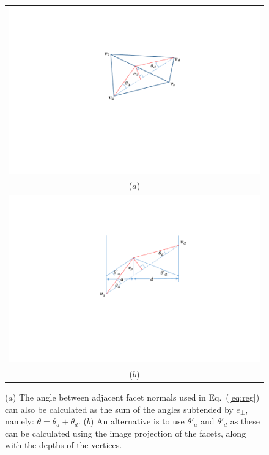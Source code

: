 \begin{figure}
\begin{center}
\begin{tabular}{c}
   \includegraphics[trim=140 110 130 70,clip,width=0.6\linewidth]{Figures/adjacentFacets} \\
   ($a$) \\
   \includegraphics[trim=140 110 140 60,clip,width=0.7\linewidth]{Figures/adjacentApprox} \\
   ($b$) \\
\end{tabular}
\end{center}
   \caption{($a$) The angle between adjacent facet normals used in Eq.~(\ref{eq:reg}) can also be calculated as the sum of the angles subtended by $e_\perp$, namely: $\theta = \theta_a+\theta_d$. ($b$) An alternative is to use $\theta'_a$  and $\theta'_d$ as these can be calculated using the image projection of the facets, along with the depths of the vertices. }
\label{fig:regularization}
\end{figure}

